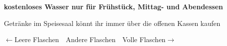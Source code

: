 \documentclass[36pt]{scrartcl}
\begin{document}
\vfill

\vfill
\begin{center}
\fontsize{40}{48}
\textbf{kostenloses Wasser nur für Frühstück, Mittag- und Abendessen}
\end{center}
\vfill
\begin{center}
 Getränke im Speisesaal könnt ihr immer über die offenen Kassen kaufen
\end{center}
\vfill
$\leftarrow$Leere Flaschen~\hfill~Andere Flaschen~\hfill~Volle Flaschen$\rightarrow$
\vfill
\end{document}
